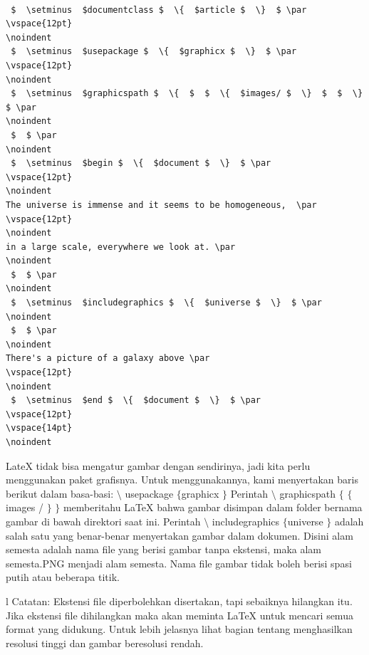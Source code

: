 \vspace{12pt}
\noindent
\begin{verbatim}

 $  \setminus  $documentclass $  \{  $article $  \}  $ \par
\vspace{12pt}
\noindent
 $  \setminus  $usepackage $  \{  $graphicx $  \}  $ \par
\vspace{12pt}
\noindent
 $  \setminus  $graphicspath $  \{  $  $  \{  $images/ $  \}  $  $  \}  $ \par
\noindent
 $  $ \par
\noindent
 $  \setminus  $begin $  \{  $document $  \}  $ \par
\vspace{12pt}
\noindent
The universe is immense and it seems to be homogeneous,  \par
\vspace{12pt}
\noindent
in a large scale, everywhere we look at. \par
\noindent
 $  $ \par
\noindent
 $  \setminus  $includegraphics $  \{  $universe $  \}  $ \par
\noindent
 $  $ \par
\noindent
There's a picture of a galaxy above \par
\vspace{12pt}
\noindent
 $  \setminus  $end $  \{  $document $  \}  $ \par
\vspace{12pt}
\vspace{14pt}
\noindent
\end{verbatim}
 \hspace*{0.5in} LateX tidak bisa mengatur gambar dengan sendirinya, jadi kita perlu menggunakan paket grafisnya. Untuk menggunakannya, kami menyertakan baris berikut dalam basa-basi:  $  \setminus  $ usepackage  $  \{  $graphicx $  \}  $ Perintah  $  \setminus  $ graphicspath  $  \{  $ $  \{  $images / $  \}  $ $  \}  $ memberitahu LaTeX bahwa gambar disimpan dalam folder bernama gambar di bawah direktori saat ini. Perintah  $  \setminus  $ includegraphics  $  \{  $universe $  \}  $ adalah salah satu yang benar-benar menyertakan gambar dalam dokumen. Disini alam semesta adalah nama file yang berisi gambar tanpa ekstensi, maka alam semesta.PNG menjadi alam semesta. Nama file gambar tidak boleh berisi spasi putih atau beberapa titik. \par
\vspace{12pt}l
\vspace{12pt}
\noindent
Catatan: Ekstensi file diperbolehkan disertakan, tapi sebaiknya hilangkan itu. Jika ekstensi file dihilangkan maka akan meminta LaTeX untuk mencari semua format yang didukung. Untuk lebih jelasnya lihat bagian tentang menghasilkan resolusi tinggi dan gambar beresolusi rendah. \par
\vspace{12pt}
\vspace{12pt}
\noindent

